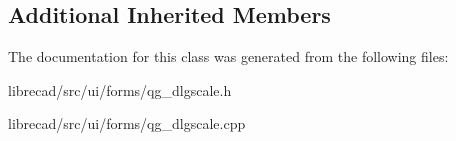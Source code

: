 \subsection*{Additional Inherited Members}


The documentation for this class was generated from the following files\-:\begin{DoxyCompactItemize}
\item 
librecad/src/ui/forms/qg\-\_\-dlgscale.\-h\item 
librecad/src/ui/forms/qg\-\_\-dlgscale.\-cpp\end{DoxyCompactItemize}
